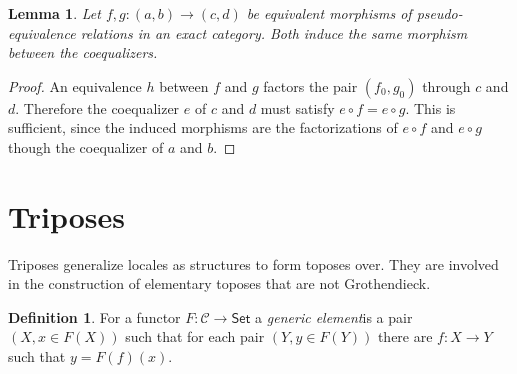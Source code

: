 \documentclass[sort&compress,draft]{elsarticle}
\theoremstyle{plain}
\newtheorem{lemma}[theorem]{Lemma}
\theoremstyle{definition}
\newtheorem{definition}[theorem]{Definition}
\theoremstyle{remark}
\newcommand\hide[1]{}
\newcommand\key[1]{\emph{#1}\label{#1}}
\newcommand\cat\mathcal
\newcommand\of:
\newcommand\id{\mathrm{id}}
\newcommand\cod{\mathrm{cod}}
\newcommand\di{_!}
\newcommand\Cat\mathsf
\newcommand\Set{\Cat{Set}}
\begin{document}
\begin{lemma} Let $f,g\of(a,b)\to(c,d)$ be equivalent morphisms of pseudo-e\-qui\-va\-len\-ce relations in an exact category. Both induce the same morphism between the coequalizers. \label{equivalence implies equality} \end{lemma}

\begin{proof} An equivalence $h$ between $f$ and $g$ factors the pair $(f_0,g_0)$ through $c$ and $d$. Therefore the coequalizer $e$ of $c$ and $d$ must satisfy $e\circ f=e\circ g$. This is sufficient, since the induced morphisms are the factorizations of $e \circ f$ and $e\circ g$ though the coequalizer of $a$ and $b$.
\end{proof}


\hide{\begin{lemma} Let $F\of\cat C\to\cat D$ be a finite limit preserving fully faithful between categories with finite limits and let $\cat D$ be exact. If for each exact $\cat E$ each finite limit preserving functor $G\of\cat C\to\cat E$ has a finite limit preserving left Kan extension $F\di(G)$ along $F$ then $F$ is resolvent. \label{left to resolvent}\end{lemma}

\begin{proof} Define $\cat E$ as follows. Objects are regular epimorphisms $FX\to Y$ in $\cat D$. A morphism $e\to e'$ is a morphism $f\of\cod(e)\to\cod(e')$
such that $f\circ e$ factors through $e'$. This category $\cat E$ is easily proved exact. Let $G\of \cat C\to\cat E$ map $X$ to $\id_{FX}$. This functor preserves finite limits. Any left Kan extension $F\di(G)$ sends each object $D$ of $\cat D$ to a resolvent embedding. Therefore $F$ is resolvent.
\end{proof}}

\hide{ The intuition is equational and essentially algebraic logic. Finite limit preserving functors preserve these.}

\section{Triposes}
Triposes generalize locales as structures to form toposes over. They are involved in the construction of elementary toposes that are not Grothendieck.

\begin{definition}
For a functor $F\of\cat C\to\Set$ a \key{generic element} is a pair $(X,x\in F(X))$ such that for each pair $(Y,y\in F(Y))$ there are $f\of X\to Y$ such that $y = F(f)(x)$. \hide{we can probably recycle this concept dozens of times, in particular as part of the definition of resolvent.}
\end{definition}
\end{document}
